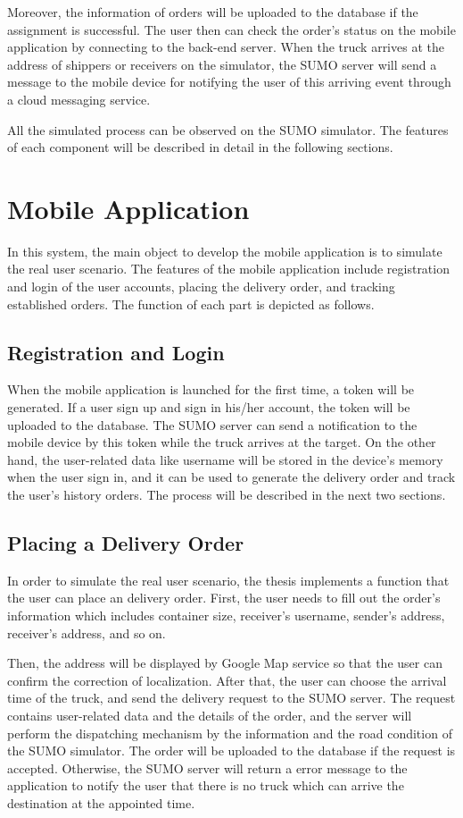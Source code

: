 \documentclass[12pt]{ksthesis}
\begin{document}
\begin{thesis}
{Moreover, the information of orders will be uploaded to the database if the assignment is successful. The user then can check the order’s status on the mobile application by connecting to the back-end server. When the truck arrives at the address of shippers or receivers on the simulator, the SUMO server will send a message to the mobile device for notifying the user of this arriving event through a cloud messaging service. 

All the simulated process can be observed on the SUMO simulator. The features of each component will be described in detail in the following sections.

\section{Mobile Application}
In this system, the main object to develop the mobile application is to simulate the real user scenario. The features of the mobile application include registration and login of the user accounts, placing the delivery order, and tracking established orders. The function of each part is depicted as follows.

\subsection{Registration and Login}
When the mobile application is launched for the first time, a token will be generated. If a user sign up and sign in his/her account, the token will be uploaded to the database. The SUMO server can send a notification to the mobile device by this token while the truck arrives at the target. On the other hand, the user-related data like username will be stored in the device’s memory when the user sign in, and it can be used to generate the delivery order and track the user’s history orders. The process will be described in the next two sections.

\subsection{Placing a Delivery Order}
In order to simulate the real user scenario, the thesis implements a function that the user can place an delivery order. First, the user needs to fill out the order’s information which includes container size, receiver’s username, sender’s address, receiver’s address, and so on. 

Then, the address will be displayed by Google Map service so that the user can confirm the correction of localization. After that, the user can choose the arrival time of the truck, and send the delivery request to the SUMO server. The request contains user-related data and the details of the order, and the server will perform the dispatching mechanism by the information and the road condition of the SUMO simulator. The order will be uploaded to the database if the request is accepted. Otherwise, the SUMO server will return a error message to the application to notify the user that there is no truck which can arrive the destination at the appointed time.

}
\end{thesis}
\end{document}

